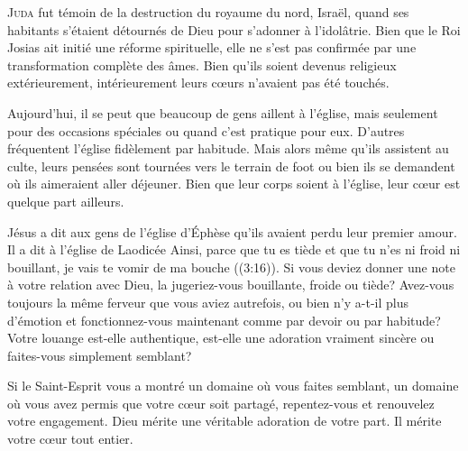 


\lettrine{J}{uda} fut témoin de la destruction du royaume du nord, Israël,
 quand ses habitants s'étaient détournés de Dieu pour s'adonner
 à l'idolâtrie. Bien que le Roi Josias ait initié une réforme spirituelle,
 elle ne s'est pas confirmée par une transformation complète des âmes.
 Bien qu'ils soient devenus religieux extérieurement,
 intérieurement leurs c\oe{}urs n'avaient pas 
 été touchés. 

Aujourd'hui, il se peut que beaucoup de gens aillent à l'église,
 mais seulement pour des occasions spéciales ou quand c'est pratique pour eux.
 D'autres fréquentent l'église fidèlement \ocadr par habitude.
 Mais alors même qu'ils assistent au culte, leurs pensées sont tournées
 vers le terrain de foot ou bien ils se demandent où ils aimeraient
 aller déjeuner. Bien que leur corps soient à l'église,
 leur c\oe{}ur est quelque part ailleurs. 


Jésus a dit aux gens de l'église d'Éphèse qu'ils avaient perdu
 leur premier amour. Il a dit à l'église de Laodicée\frcolon{} 
 \Og Ainsi, parce que tu es tiède et que tu n'es ni froid ni bouillant,
 je vais te vomir de ma bouche \Fg{} 
 ((3:16)).
 Si vous deviez donner une note à votre relation avec Dieu,
 la jugeriez-vous bouillante, froide ou tiède?
 Avez-vous toujours la même ferveur que vous aviez autrefois,
 ou bien n'y a-t-il plus d'émotion et fonctionnez-vous maintenant
 comme par devoir ou par habitude? Votre louange est-elle authentique,
 est-elle une adoration vraiment sincère ou faites-vous simplement semblant? 

Si le Saint-Esprit vous a montré un domaine où vous faites semblant,
 un domaine où vous avez permis que votre c\oe{}ur soit partagé,
 repentez-vous et renouvelez votre engagement. Dieu mérite une véritable
 adoration de votre part. Il mérite votre c\oe{}ur tout entier. 

\dvrule

